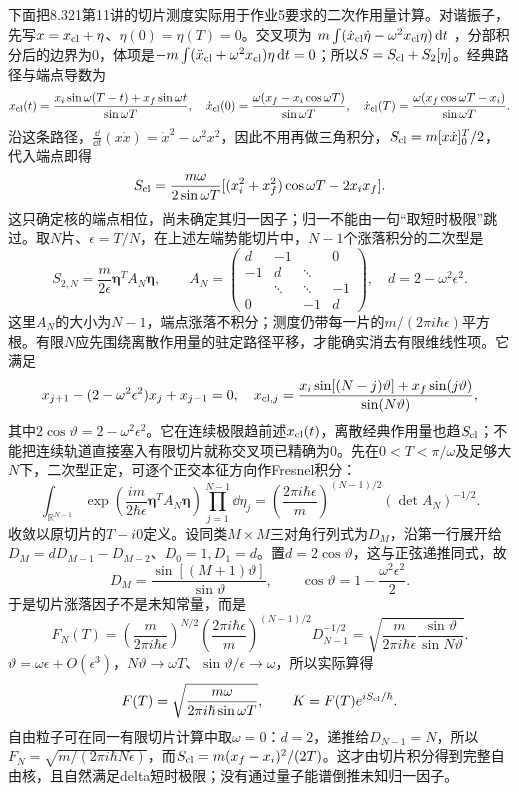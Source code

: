 下面把8.321第11讲的切片测度实际用于作业5要求的二次作用量计算。对谐振子，先写$x=x_{\rm cl}+\eta$、$\eta(0)=\eta(T)=0$。交叉项为
$m\int(\dot x_{\rm cl}\dot\eta-\omega^2x_{\rm cl}\eta)\,\mathrm d t$
，分部积分后的边界为0，体项是$-m\int(\ddot x_{\rm cl}+\omega^2x_{\rm cl})\eta\,\mathrm d t=0$；所以$S=S_{\rm cl}+S_2[\eta]$。经典路径与端点导数为
\[
 x_{\rm cl}(t)=\frac{x_i\sin\omega(T-t)+x_f\sin\omega t}{\sin\omega T},\quad
 \dot x_{\rm cl}(0)=\frac{\omega(x_f-x_i\cos\omega T)}{\sin\omega T},\quad
 \dot x_{\rm cl}(T)=\frac{\omega(x_f\cos\omega T-x_i)}{\sin\omega T}.
\]
沿这条路径，$\frac{\dd}{\dd t}(x\dot x)=\dot x^2-\omega^2x^2$，因此不用再做三角积分，$S_{\rm cl}=m[x\dot x]_0^T/2$，代入端点即得
\[
 S_{\rm cl}=\frac{m\omega}{2\sin\omega T}
 [(x_i^2+x_f^2)\cos\omega T-2x_ix_f].
\]
这只确定核的端点相位，尚未确定其归一因子；归一不能由一句“取短时极限”跳过。取$N$片、$\epsilon=T/N$，在上述左端势能切片中，$N-1$个涨落积分的二次型是
\[
 S_{2,N}=\frac m{2\epsilon}\boldsymbol\eta^TA_N\boldsymbol\eta,\qquad
 A_N=\begin{pmatrix}
 d&-1&&0\\-1&d&\ddots&\\&\ddots&\ddots&-1\\0&&-1&d
 \end{pmatrix},\quad d=2-\omega^2\epsilon^2.
\]
这里$A_N$的大小为$N-1$，端点涨落不积分；测度仍带每一片的$m/(2\pi i\hbar\epsilon)$平方根。有限$N$应先围绕离散作用量的驻定路径平移，才能确实消去有限维线性项。它满足
\[
 x_{j+1}-(2-\omega^2\epsilon^2)x_j+x_{j-1}=0,\quad
 x_{{\rm cl},j}=\frac{x_i\sin[(N-j)\vartheta]+x_f\sin(j\vartheta)}{\sin(N\vartheta)},
\]
其中$2\cos\vartheta=2-\omega^2\epsilon^2$。它在连续极限趋前述$x_{\rm cl}(t)$，离散经典作用量也趋$S_{\rm cl}$；不能把连续轨道直接塞入有限切片就称交叉项已精确为0。先在$0<T<\pi/\omega$及足够大$N$下，二次型正定，可逐个正交本征方向作Fresnel积分：
\[
 \int_{\mathbb R^{N-1}}\exp\!\left(\frac{im}{2\hbar\epsilon}\boldsymbol\eta^TA_N\boldsymbol\eta\right)
 \prod_{j=1}^{N-1}\dd\eta_j
 =\left(\frac{2\pi i\hbar\epsilon}m\right)^{(N-1)/2}(\det A_N)^{-1/2}.
\]
收敛以原切片的$T-i0$定义。设同类$M\times M$三对角行列式为$D_M$，沿第一行展开给$D_M=dD_{M-1}-D_{M-2}$、$D_0=1,D_1=d$。置$d=2\cos\vartheta$，这与正弦递推同式，故
\[
 D_M=\frac{\sin[(M+1)\vartheta]}{\sin\vartheta},\qquad
 \cos\vartheta=1-\frac{\omega^2\epsilon^2}{2}.
\]
于是切片涨落因子不是未知常量，而是
\[
 F_N(T)=\left(\frac m{2\pi i\hbar\epsilon}\right)^{N/2}
 \left(\frac{2\pi i\hbar\epsilon}m\right)^{(N-1)/2}D_{N-1}^{-1/2}
 =\sqrt{\frac m{2\pi i\hbar\epsilon}\frac{\sin\vartheta}{\sin N\vartheta}}.
\]
$\vartheta=\omega\epsilon+O(\epsilon^3)$，$N\vartheta\to\omega T$、$\sin\vartheta/\epsilon\to\omega$，所以实际算得
\[
 F(T)=\sqrt{\frac{m\omega}{2\pi i\hbar\sin\omega T}},\qquad
 K=F(T)e^{iS_{\rm cl}/\hbar}.
\]
自由粒子可在同一有限切片计算中取$\omega=0$：$d=2$，递推给$D_{N-1}=N$，所以$F_N=\sqrt{m/(2\pi i\hbar N\epsilon)}$，而$S_{\rm cl}=m(x_f-x_i)^2/(2T)$。这才由切片积分得到完整自由核，且自然满足delta短时极限；没有通过量子能谱倒推未知归一因子。

